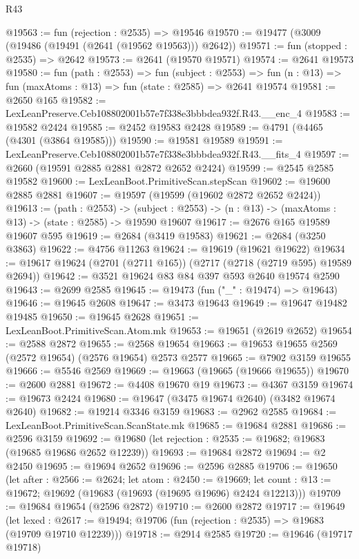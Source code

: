 \begin{lexlean}{R43}
\begin{coremodule}
@19563 := fun (rejection : @2535) => @19546
@19570 := @19477 (@3009 (@19486 (@19491 (@2641 (@19562 @19563))) @2642))
@19571 := fun (stopped : @2535) => @2642
@19573 := @2641 (@19570 @19571)
@19574 := @2641 @19573
@19580 := fun (path : @2553) =>
  fun (subject : @2553) =>
  fun (n : @13) => fun (maxAtoms : @13) => fun (state : @2585) => @2641 @19574
@19581 := @2650 @165
@19582 := LexLeanPreserve.Ceb108802001b57e7f338e3bbbdea932f.R43.__enc_4
@19583 := @19582 @2424
@19585 := @2452 @19583 @2428
@19589 := @4791 (@4465 (@4301 (@3864 @19585)))
@19590 := @19581 @19589
@19591 := LexLeanPreserve.Ceb108802001b57e7f338e3bbbdea932f.R43.__fits_4
@19597 := @2660 (@19591 @2885 @2881 @2872 @2652 @2424)
@19599 := @2545 @2585 @19582
@19600 := LexLeanBoot.PrimitiveScan.stepScan
@19602 := @19600 @2885 @2881
@19607 := @19597 (@19599 (@19602 @2872 @2652 @2424))
@19613 := (path : @2553) ->
  (subject : @2553) -> (n : @13) -> (maxAtoms : @13) -> (state : @2585) -> @19590 @19607
@19617 := @2676 @165 @19589 @19607 @595
@19619 := @2684 (@3419 @19583)
@19621 := @2684 (@3250 @3863)
@19622 := @4756 @11263
@19624 := @19619 (@19621 @19622)
@19634 := @19617 @19624 (@2701 (@2711 @165)) (@2717 (@2718 (@2719 @595) @19589 @2694))
@19642 := @3521 @19624 @83 @84 @397 @593 @2640 @19574 @2590
@19643 := @2699 @2585
@19645 := @19473 (fun ("_" : @19474) => @19643)
@19646 := @19645 @2608
@19647 := @3473 @19643
@19649 := @19647 @19482 @19485
@19650 := @19645 @2628
@19651 := LexLeanBoot.PrimitiveScan.Atom.mk
@19653 := @19651 (@2619 @2652)
@19654 := @2588 @2872
@19655 := @2568 @19654
@19663 := @19653 @19655 @2569 (@2572 @19654) (@2576 @19654) @2573 @2577
@19665 := @7902 @3159 @19655
@19666 := @5546 @2569
@19669 := @19663 (@19665 (@19666 @19655))
@19670 := @2600 @2881
@19672 := @4408 @19670 @19
@19673 := @4367 @3159
@19674 := @19673 @2424
@19680 := @19647 (@3475 @19674 @2640) (@3482 @19674 @2640)
@19682 := @19214 @3346 @3159
@19683 := @2962 @2585
@19684 := LexLeanBoot.PrimitiveScan.ScanState.mk
@19685 := @19684 @2881
@19686 := @2596 @3159
@19692 := @19680 (let rejection : @2535 := @19682; @19683 (@19685 @19686 @2652 @12239))
@19693 := @19684 @2872
@19694 := @2 @2450
@19695 := @19694 @2652
@19696 := @2596 @2885
@19706 := @19650
    (let after : @2566 := @2624;
    let atom : @2450 := @19669;
    let count : @13 := @19672; @19692 (@19683 (@19693 (@19695 @19696) @2424 @12213)))
@19709 := @19684 @19654 (@2596 @2872)
@19710 := @2600 @2872
@19717 := @19649
    (let lexed : @2617 := @19494; @19706 (fun (rejection : @2535) => @19683 (@19709 @19710 @12239)))
@19718 := @2914 @2585
@19720 := @19646 (@19717 @19718)

\end{coremodule}
\end{lexlean}
